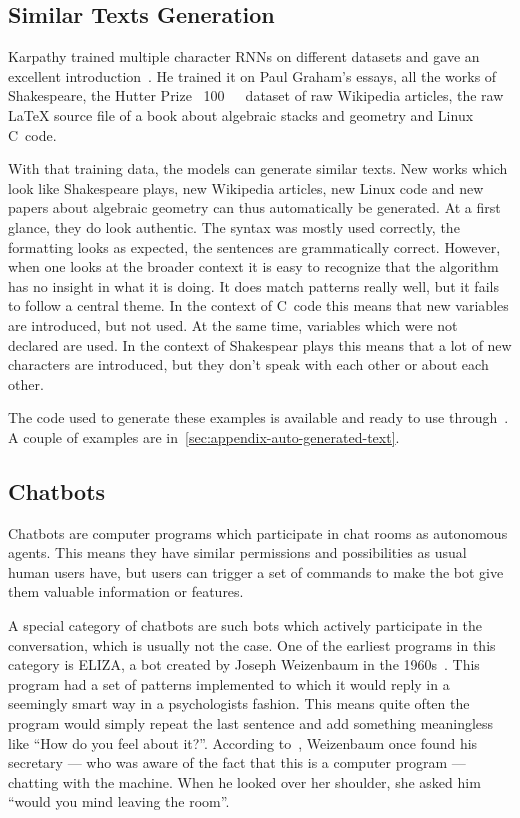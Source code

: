 \subsection{Similar Texts Generation}
Karpathy trained multiple character \glspl{RNN} on different datasets and gave
an excellent introduction~\cite{Karpathy2015}. He trained it on Paul Graham's
essays, all the works of Shakespeare, the Hutter Prize~\cite{hutterPrize}
\SI{100}{\mega\byte}~dataset of raw Wikipedia articles, the raw \LaTeX{} source
file of a book about algebraic stacks and geometry and Linux C~code.

With that training data, the models can generate similar texts. New works which
look like Shakespeare plays, new Wikipedia articles, new Linux code and new
papers about algebraic geometry can thus automatically be generated. At a first
glance, they do look authentic. The syntax was mostly used correctly, the
formatting looks as expected, the sentences are grammatically correct. However,
when one looks at the broader context it is easy to recognize that the
algorithm has no insight in what it is doing. It does match patterns really
well, but it fails to follow a central theme. In the context of C~code this
means that new variables are introduced, but not used. At the same time,
variables which were not declared are used. In the context of Shakespear plays
this means that a lot of new characters are introduced, but they don't speak
with each other or about each other.

The code used to generate these examples is available and ready to use
through~\cite{charRNNgithub}. A couple of examples are
in~\cref{sec:appendix-auto-generated-text}.


\subsection{Chatbots}%
\label{subsec:chatbots}%

Chatbots are computer programs which participate in chat rooms as autonomous
agents. This means they have similar permissions and possibilities as usual human
users have, but users can trigger a set of commands to make the bot give them
valuable information or features.

A special category of chatbots are such bots which actively participate in the
conversation, which is usually not the case. One of the earliest programs in
this category is ELIZA, a bot created by Joseph Weizenbaum in the
1960s~\cite{Weizenbaum1976}. This program had a set of patterns implemented to
which it would reply in a seemingly smart way in a psychologists fashion. This
means quite often the program would simply repeat the last sentence and add
something meaningless like \enquote{How do you feel about it?}. According
to~\cite{Curtis2014}, Weizenbaum once found his secretary --- who was aware of
the fact that this is a computer program --- chatting with the machine. When he
looked over her shoulder, she asked him \enquote{would you mind leaving the
room}.

